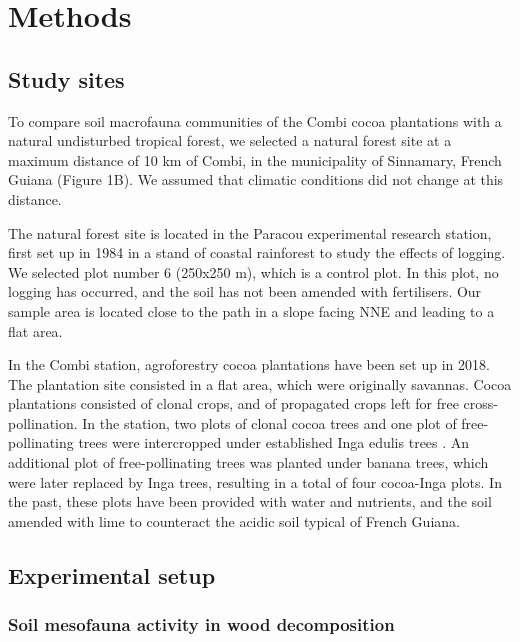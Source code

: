 \documentclass[fleqn,10pt]{ArtEcoFoG} %
\begin{document}
\section{Methods}\label{methods}

\subsection{Study sites}\label{study-sites}

To compare soil macrofauna communities of the Combi cocoa plantations with a natural undisturbed tropical forest, we selected a natural forest site at a maximum distance of 10 km of Combi, in the municipality of Sinnamary, French Guiana (Figure 1B). We assumed that climatic conditions did not change at this distance.

The natural forest site is located in the Paracou experimental research station, first set up in 1984 in a stand of coastal rainforest to study the effects of logging. We selected plot number 6 (250x250 m), which is a control plot. In this plot, no logging has occurred, and the soil has not been amended with fertilisers. Our sample area is located close to the path in a slope facing NNE and leading to a flat area.

In the Combi station, agroforestry cocoa plantations have been set up in 2018. The plantation site consisted in a flat area, which were originally savannas. Cocoa plantations consisted of clonal crops, and of propagated crops left for free cross-pollination. In the station, two plots of clonal cocoa trees and one plot of free-pollinating trees were intercropped under established Inga edulis trees \citep{saj_projetc2g2_2023}. An additional plot of free-pollinating trees was planted under banana trees, which were later replaced by Inga trees, resulting in a total of four cocoa-Inga plots. In the past, these plots have been provided with water and nutrients, and the soil amended with lime to counteract the acidic soil typical of French Guiana.

\subsection{Experimental setup}\label{experimental-setup}

\subsubsection{Soil mesofauna activity in wood decomposition}\label{soil-mesofauna-activity-in-wood-decomposition}
\end{document}
